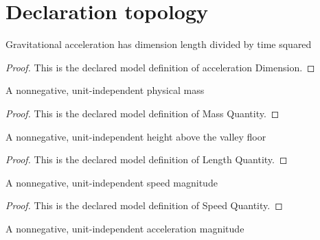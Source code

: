 \section{Declaration topology}
\begin{definition}
  \label{def:physics:phyx-mini-0764:phyxminiproblems-problemphyxmini0764-accelerationdimension}
  Gravitational acceleration has dimension length divided by time squared
\end{definition}
\begin{proof}
  This is the declared model definition of acceleration Dimension.
\end{proof}
\begin{definition}
  \label{def:physics:phyx-mini-0764:phyxminiproblems-problemphyxmini0764-massquantity}
  A nonnegative, unit-independent physical mass
\end{definition}
\begin{proof}
  This is the declared model definition of Mass Quantity.
\end{proof}
\begin{definition}
  \label{def:physics:phyx-mini-0764:phyxminiproblems-problemphyxmini0764-lengthquantity}
  A nonnegative, unit-independent height above the valley floor
\end{definition}
\begin{proof}
  This is the declared model definition of Length Quantity.
\end{proof}
\begin{definition}
  \label{def:physics:phyx-mini-0764:phyxminiproblems-problemphyxmini0764-speedquantity}
  A nonnegative, unit-independent speed magnitude
\end{definition}
\begin{proof}
  This is the declared model definition of Speed Quantity.
\end{proof}
\begin{definition}
  \label{def:physics:phyx-mini-0764:phyxminiproblems-problemphyxmini0764-accelerationquantity}
  A nonnegative, unit-independent acceleration magnitude
\end{definition}
